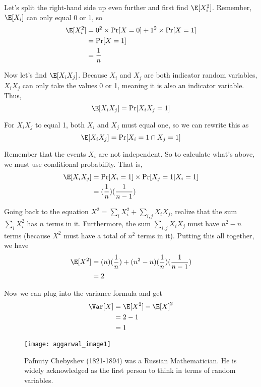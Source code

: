 Let’s split the right-hand side up even further and first find $\E[X_{i}^{2}]$. Remember, $\E[X_{i}]$ can only equal 0 or 1, so
    \begin{align*}
        \E[X_{i}^{2}] &= 0^{2} \times \Pr[X = 0] + 1^{2} \times \Pr[X = 1] \\
        &= \Pr[X = 1] \\
        &= \frac{1}{n}
    \end{align*}
    
Now let's find $\E[X_{i}X_{j}]$. Because $X_{i}$ and $X_{j}$ are both indicator random variables, $X_{i}X_{j}$ can only take the values 0 or 1, meaning it is also an indicator variable. Thus, 
    $$
    \E[X_{i}X_{j}] = \Pr[X_{i}X_{j} = 1]
    $$

For $X_{i}X_{j}$ to equal 1, both $X_{i}$ and $X_{j}$ must equal one, so we can rewrite this as
    $$
    \E[X_{i}X_{j}] = \Pr[X_{i} = 1 \cap X_{j} = 1]
    $$
    
Remember that the events $X_{i}$ are not independent. So to calculate what’s above, we must use conditional probability. That is,
    \begin{align*}
        \E[X_{i}X_{j}] &= \Pr[X_{i} = 1] \times \Pr[X_{j} = 1|X_{i} = 1] \\
        &= (\frac{1}{n})(\frac{1}{n-1})
    \end{align*}
    
\vspace{1.5mm}
    
Going back to the equation $X^{2} = \sum\limits_{i}X_{i}^{2} + \sum\limits_{i,j}X_{i}X_{j}$, realize that the sum $\sum\limits_{i}X_{i}^{2}$ has $n$ terms in it. Furthermore, the sum $\sum\limits_{i,j}X_{i}X_{j}$ must have $n^{2}-n$ terms (because $X^{2}$ must have a total of $n^{2}$ terms in it). Putting this all together, we have
    \begin{align*}
        \E[X^{2}] &= (n)(\frac{1}{n}) + (n^{2}-n)(\frac{1}{n})(\frac{1}{n-1}) \\
        &= 2
    \end{align*}
    
Now we can plug into the variance formula and get
\begin{align*}
    \Var[X] &= \E[X^{2}] - \E[X]^{2} \\
    &= 2 - 1 \\
    &= 1
\end{align*}

\vspace{1cm}

\begin{figure}[htp]
    \centering
    \begin{minipage}{9cm}
    \texttt{[image: aggarwal\_image1]}
    \caption{Pafnuty Chebyshev (1821-1894) was a Russian Mathematician. He is widely acknowledged as the first person to think in terms of random variables. }
    \label{fig:1}
    \end{minipage}
\end{figure}
